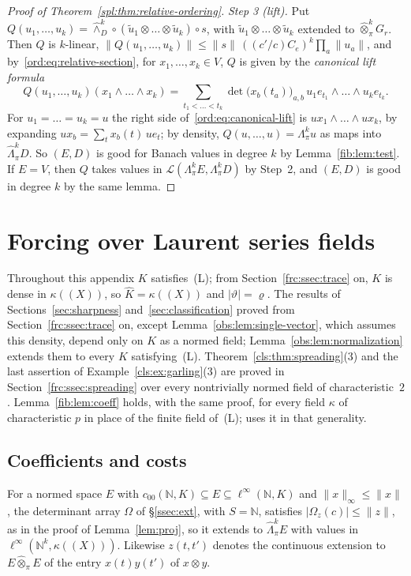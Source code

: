 \documentclass[11pt]{amsart}
\theoremstyle{definition}
\theoremstyle{remark}
\numberwithin{equation}{section}
\newcommand{\N}{\mathbb N}
\newcommand{\cL}{\mathcal L}
\newcommand{\linf}{\ell^\infty}
\newcommand{\abs}[1]{\lvert #1\rvert}
\newcommand{\norm}[1]{\lVert #1\rVert}
\newcommand{\Kh}{\widehat K}
\theoremstyle{plain}
\theoremstyle{definition}
\theoremstyle{plain}
\begin{document}
\begin{proof}[Proof of Theorem~\ref{spl:thm:relative-ordering}]
\emph{Step 3 (lift).} Put $Q(u_1,\dots,u_k)=\widehat\wedge^k_D\circ(\tilde u_1\otimes\dots\otimes\tilde u_k)\circ s$, with
$\tilde u_1\otimes\dots\otimes\tilde u_k$ extended to $\widehat\otimes^k_\pi G_r$. Then $Q$ is $k$\nobreakdash-linear,
$\norm{Q(u_1,\dots,u_k)}\le\norm s\,((c'/c)C_e)^k\prod_a\norm{u_a}$, and by~\eqref{ord:eq:relative-section}, for
$x_1,\dots,x_k\in V$, $Q$ is given by the \emph{canonical lift formula}
\begin{equation}\label{ord:eq:canonical-lift}
 Q(u_1,\dots,u_k)(x_1\wedge\dots\wedge x_k)=\sum_{t_1<\dots<t_k}\det\bigl(x_b(t_a)\bigr)_{a,b}\,
 u_1e_{t_1}\wedge\dots\wedge u_ke_{t_k}.
\end{equation}
For $u_1=\dots=u_k=u$ the right side of~\eqref{ord:eq:canonical-lift} is $ux_1\wedge\dots\wedge ux_k$, by expanding
$ux_b=\sum_tx_b(t)\,ue_t$; by density, $Q(u,\dots,u)=\Lambda^k_\pi u$ as maps into $\widehat\Lambda^k_\pi D$. So
$(E,D)$ is good for Banach values in degree $k$ by Lemma~\ref{fib:lem:test}. If $E=V$, then $Q$ takes values in
$\cL(\Lambda^k_\pi E,\Lambda^k_\pi D)$ by Step~2, and $(E,D)$ is good in degree $k$ by the same lemma.
\end{proof}
\section{Forcing over Laurent series fields}\label{app:forcing}

Throughout this appendix $K$ satisfies~\textup{(L)}; from Section~\ref{frc:ssec:trace} on, $K$ is dense in $\kappa((X))$,
so $\Kh=\kappa((X))$ and $\abs\vartheta=\varrho$. The results of Sections~\ref{sec:sharpness} and~\ref{sec:classification}
proved from Section~\ref{frc:ssec:trace} on, except Lemma~\ref{obs:lem:single-vector}, which assumes this density, depend
only on $K$ as a normed field; Lemma~\ref{obs:lem:normalization} extends them to every $K$ satisfying~\textup{(L)}.
Theorem~\ref{cls:thm:spreading}(3) and the last assertion of Example~\ref{cls:ex:garling}(3) are proved in
Section~\ref{frc:ssec:spreading} over every nontrivially normed field of characteristic~$2$. Lemma~\ref{fib:lem:coeff}
holds, with the same proof, for every field $\kappa$ of characteristic $p$ in place of the finite field
of~\textup{(L)}; \cite{II} uses it in that generality.

\subsection{Coefficients and costs}\label{frc:ssec:costs}
For a normed space $E$ with $c_{00}(\N,K)\subseteq E\subseteq\linf(\N,K)$ and $\norm x_\infty\le\norm x$, the determinant
array $\Omega$ of \S\ref{ssec:ext}, with $S=\N$, satisfies $\abs{\Omega_z(c)}\le\norm z$, as in the proof of
Lemma~\ref{lem:proj}, so it extends to $\widehat\Lambda^k_\pi E$ with values in $\linf(\N^k,\kappa((X)))$. Likewise
$z(t,t')$ denotes the continuous extension to $E\widehat\otimes_\pi E$ of the entry $x(t)y(t')$ of $x\otimes y$.
\end{document}
